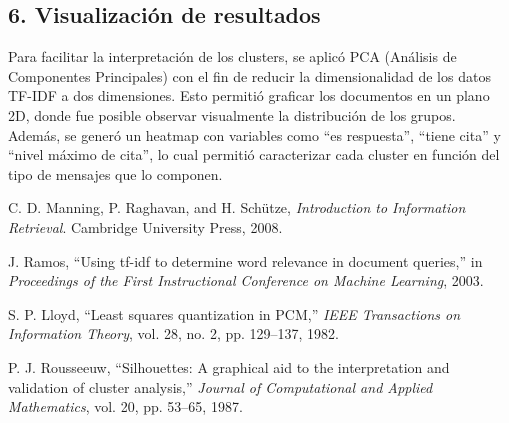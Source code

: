 \documentclass[journal]{IEEEtran} %
\begin{document}
\subsection{6. Visualización de resultados}
Para facilitar la interpretación de los clusters, se aplicó PCA (Análisis de Componentes Principales) con el fin de reducir la dimensionalidad de los datos TF-IDF a dos dimensiones. Esto permitió graficar los documentos en un plano 2D, donde fue posible observar visualmente la distribución de los grupos. Además, se generó un heatmap con variables como “es respuesta”, “tiene cita” y “nivel máximo de cita”, lo cual permitió caracterizar cada cluster en función del tipo de mensajes que lo componen.


\begin{thebibliography}{9}

C. D. Manning, P. Raghavan, and H. Schütze, \textit{Introduction to Information Retrieval}. Cambridge University Press, 2008.

J. Ramos, “Using tf-idf to determine word relevance in document queries,” in \textit{Proceedings of the First Instructional Conference on Machine Learning}, 2003.

S. P. Lloyd, “Least squares quantization in PCM,” \textit{IEEE Transactions on Information Theory}, vol. 28, no. 2, pp. 129–137, 1982.

P. J. Rousseeuw, “Silhouettes: A graphical aid to the interpretation and validation of cluster analysis,” \textit{Journal of Computational and Applied Mathematics}, vol. 20, pp. 53–65, 1987.

\end{thebibliography}

\vspace{12pt}
\end{document}
